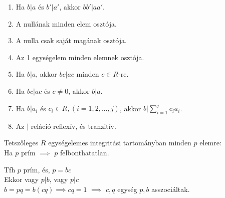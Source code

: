 \begin{frame}
\begin{tcolorbox}[title={Tétel: Az oszthatóság tulajdonságai EIT-ban}]
\begin{enumerate}
\item Ha $b|a$ és $b'|a'$, akkor $bb'|aa'$.
\item A nullának minden elem osztója.
\item A nulla csak saját magának osztója.
\item Az 1 egységelem minden elemnek osztója.
\item Ha $b|a$, akkor $bc|ac$ minden $c \in R$-re.
\item Ha $bc|ac$ és $c \neq 0$, akkor $b|a$.
\item Ha $b|a_i$ és $c_i \in R, (i = 1, 2, ..., j)$, akkor $b|\sum^j_{i=1} c_ia_i$.
\item Az $|$ reláció reflexív, és tranzitív.
\end{enumerate}
\end{tcolorbox}
\end{frame}

\begin{frame}
\begin{tcolorbox}[title={Tétel: Prím és irreducibilis elem EIT-ban}]
Tetszőleges $R$ egységelemes integritási tartományban minden $p$ elemre:\\
Ha $p$ prím $\implies$ $p$ felbonthatatlan.
\end{tcolorbox}

\begin{tcolorbox}[title={Bizonyítás}]
Tfh $p$ prím, és, $p = bc$\\
Ekkor vagy $p|b$, vagy $p|c$\\
$b = pq = b(cq) \implies cq = 1$ $\implies$ $c, q$ egység $p, b$ asszociáltak.
\end{tcolorbox}
\end{frame}

